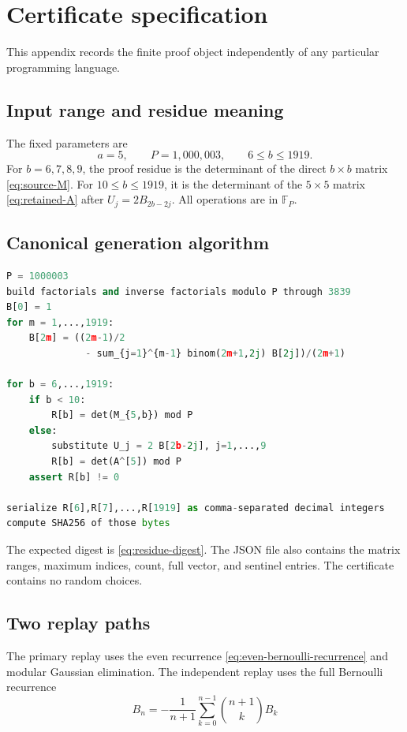 \documentclass[11pt]{article}
\theoremstyle{definition}
\newcommand{\F}{\mathbb{F}}
\begin{document}
\section{Certificate specification}
\label{app:certificate}

This appendix records the finite proof object independently of any
particular programming language.

\subsection{Input range and residue meaning}

The fixed parameters are
\[
 a=5,
 \qquad P=1{,}000{,}003,
 \qquad 6\le b\le1919.
\]
For $b=6,7,8,9$, the proof residue is the determinant of the direct
$b\times b$ matrix \eqref{eq:source-M}.  For $10\le b\le1919$, it is
the determinant of the $5\times5$ matrix \eqref{eq:retained-A} after
$U_j=2B_{2b-2j}$.  All operations are in $\F_P$.

\subsection{Canonical generation algorithm}

\begin{lstlisting}[language=Python,caption={Mathematical pseudocode for the residue vector.}]
P = 1000003
build factorials and inverse factorials modulo P through 3839
B[0] = 1
for m = 1,...,1919:
    B[2m] = ((2m-1)/2
              - sum_{j=1}^{m-1} binom(2m+1,2j) B[2j])/(2m+1)

for b = 6,...,1919:
    if b < 10:
        R[b] = det(M_{5,b}) mod P
    else:
        substitute U_j = 2 B[2b-2j], j=1,...,9
        R[b] = det(A^[5]) mod P
    assert R[b] != 0

serialize R[6],R[7],...,R[1919] as comma-separated decimal integers
compute SHA256 of those bytes
\end{lstlisting}

The expected digest is \eqref{eq:residue-digest}.  The JSON file also
contains the matrix ranges, maximum indices, count, full vector, and
sentinel entries.  The certificate contains no random choices.

\subsection{Two replay paths}

The primary replay uses the even recurrence
\eqref{eq:even-bernoulli-recurrence} and modular Gaussian elimination.
The independent replay uses the full Bernoulli recurrence
\[
 B_n=-\frac1{n+1}\sum_{k=0}^{n-1}\binom{n+1}{k}B_k
\]
\end{document}
